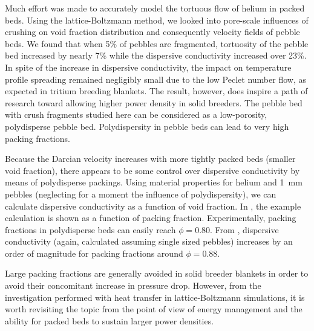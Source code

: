 Much effort was made to accurately model the tortuous flow of helium in packed beds. Using the lattice-Boltzmann method, we looked into pore-scale influences of crushing on void fraction distribution and consequently velocity fields of pebble beds. We found that when 5\% of pebbles are fragmented, tortuosity of the pebble bed increased by nearly 7\% while the dispersive conductivity increased over 23\%. In spite of the increase in dispersive conductivity, the impact on temperature profile spreading remained negligibly small due to the low Peclet number flow, as expected in tritium breeding blankets. The result, however, does inspire a path of research toward allowing higher power density in solid breeders. The pebble bed with crush fragments studied here can be considered as a low-porosity, polydisperse pebble bed. Polydispersity in pebble beds can lead to very high packing fractions.

Because the Darcian velocity increases with more tightly packed beds (smaller void fraction), there appears to be some control over dispersive conductivity by means of polydisperse packings. Using material properties for helium and \SI{1}{\milli\meter} pebbles (neglecting for a moment the influence of polydispersity), we can calculate dispersive conductivity as a function of void fraction. In , the example calculation is shown as a function of packing fraction. Experimentally, packing fractions in polydisperse beds can easily reach $\phi = 0.80$.\cite{Reimann:2000tw} From , dispersive conductivity (again, calculated assuming single sized pebbles) increases by an order of magnitude for packing fractions around $\phi =0.88$.

Large packing fractions are generally avoided in solid breeder blankets in order to avoid their concomitant increase in pressure drop. However, from the investigation performed with heat transfer in lattice-Boltzmann simulations, it is worth revisiting the topic from the point of view of energy management and the ability for packed beds to sustain larger power densities.

